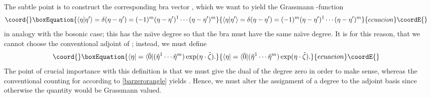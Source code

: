 \documentclass[a4paper,10pt]{article}
\begin{document}
The subtle point is to construct the corresponding bra vector \myHighlight{$\langle\eta|$}\coordHE{}, which we 
want to yield the Grassmann \myHighlight{$\delta$}\coordHE{}-function 
\begin{equation}\coord{}\boxEquation{\label{langleetatimesetaprimerangle}
\langle\eta|\eta^{\prime}\rangle=\delta(\eta-\eta^{\prime})=(-1)^m(\eta-
\eta^{\prime})^1\cdots(\eta-\eta^{\prime})^m
}{\langle\eta|\eta^{\prime}\rangle=\delta(\eta-\eta^{\prime})=(-1)^m(\eta-
\eta^{\prime})^1\cdots(\eta-\eta^{\prime})^m
}{ecuacion}\coordE{}\end{equation}
in analogy with the bosonic case; this has the na\"\i ve degree \coordHE{} so that the bra 
\myHighlight{$\langle\eta|$}\coordHE{} must have the same na\"\i ve degree. It is for this reason, that we 
cannot choose the conventional adjoint of \myHighlight{$|\eta\rangle$}\coordHE{}; instead, we must define
\begin{equation}\coord{}\boxEquation{
\langle\eta|=\langle\bar{0}|(\hat{\eta}^1\cdots\hat{\eta}^m)\exp(\eta\cdot\hat{\zeta}).
}{
\langle\eta|=\langle\bar{0}|(\hat{\eta}^1\cdots\hat{\eta}^m)\exp(\eta\cdot\hat{\zeta}).
}{ecuacion}\coordE{}\end{equation}
The point of crucial importance with this definition is that we must give the dual 
\coordHE{} of \myHighlight{$|0\rangle$}\coordHE{} the degree zero in order to make sense, whereas the 
conventional counting for \coordHE{} according to \eqref{barzerorangle} yields 
\coordHE{}. Hence, we must alter the assignment of a degree to the adjoint basis since otherwise 
the quantity \coordHE{} would be Grassmann valued.
\end{document}

